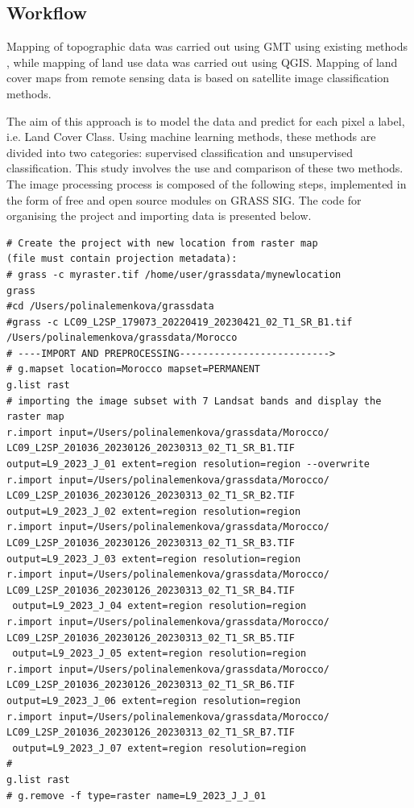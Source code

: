 \documentclass[geomatics,article,submit,pdftex,moreauthors]{Definitions/mdpi}
\begin{document}
\subsection{Workflow}

Mapping of topographic data was carried out using GMT using existing methods \cite{Lemenkova202221,Lemenkova202217,10537274,5369602}, while mapping of land use data was carried out using QGIS. Mapping of land cover maps from remote sensing data is based on satellite image classification methods.

The aim of this approach is to model the data and predict for each pixel a label, i.e. Land Cover Class. Using machine learning methods, these methods are divided into two categories: supervised classification and unsupervised classification. This study involves the use and comparison of these two methods. The image processing process is composed of the following steps, implemented in the form of free and open source modules on GRASS SIG. The code for organising the project and importing data is presented below.

\begin{footnotesize}
\begin{verbatim}
# Create the project with new location from raster map 
(file must contain projection metadata):
# grass -c myraster.tif /home/user/grassdata/mynewlocation
grass
#cd /Users/polinalemenkova/grassdata
#grass -c LC09_L2SP_179073_20220419_20230421_02_T1_SR_B1.tif 
/Users/polinalemenkova/grassdata/Morocco
# ----IMPORT AND PREPROCESSING-------------------------->
# g.mapset location=Morocco mapset=PERMANENT
g.list rast
# importing the image subset with 7 Landsat bands and display the raster map
r.import input=/Users/polinalemenkova/grassdata/Morocco/
LC09_L2SP_201036_20230126_20230313_02_T1_SR_B1.TIF 
output=L9_2023_J_01 extent=region resolution=region --overwrite
r.import input=/Users/polinalemenkova/grassdata/Morocco/
LC09_L2SP_201036_20230126_20230313_02_T1_SR_B2.TIF 
output=L9_2023_J_02 extent=region resolution=region
r.import input=/Users/polinalemenkova/grassdata/Morocco/
LC09_L2SP_201036_20230126_20230313_02_T1_SR_B3.TIF 
output=L9_2023_J_03 extent=region resolution=region
r.import input=/Users/polinalemenkova/grassdata/Morocco/
LC09_L2SP_201036_20230126_20230313_02_T1_SR_B4.TIF
 output=L9_2023_J_04 extent=region resolution=region
r.import input=/Users/polinalemenkova/grassdata/Morocco/
LC09_L2SP_201036_20230126_20230313_02_T1_SR_B5.TIF
 output=L9_2023_J_05 extent=region resolution=region
r.import input=/Users/polinalemenkova/grassdata/Morocco/
LC09_L2SP_201036_20230126_20230313_02_T1_SR_B6.TIF 
output=L9_2023_J_06 extent=region resolution=region
r.import input=/Users/polinalemenkova/grassdata/Morocco/
LC09_L2SP_201036_20230126_20230313_02_T1_SR_B7.TIF
 output=L9_2023_J_07 extent=region resolution=region
#
g.list rast
# g.remove -f type=raster name=L9_2023_J_J_01
\end{verbatim}
\end{footnotesize}
\end{document}
